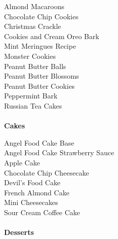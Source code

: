 \documentclass[11pt, twoside, openany]{book}
\begin{document}
Almond Macaroons\hrulefill\pageref{almond-macaroons}\\
Chocolate Chip Cookies\hrulefill\pageref{chocolate-chip-cookies}\\
Christmas Crackle\hrulefill\pageref{christmas-crackle}\\
Cookies and Cream Oreo Bark\hrulefill\pageref{cookies-and-cream-oreo-bark}\\
Mint Meringues Recipe\hrulefill\pageref{mint-meringues-recipe}\\
Monster Cookies\hrulefill\pageref{monster-cookies}\\
Peanut Butter Balls\hrulefill\pageref{peanut-butter-balls}\\
Peanut Butter Blossoms\hrulefill\pageref{peanut-butter-blossoms}\\
Peanut Butter Cookies\hrulefill\pageref{peanut-butter-cookies}\\
Peppermint Bark\hrulefill\pageref{peppermint-bark}\\
Russian Tea Cakes\hrulefill\pageref{russian-tea-cakes}\\
{~\vspace{2mm}\\ \Large \textbf{Cakes}}\hfill\textbf{\pageref{cakes}}

Angel Food Cake Base\hrulefill\pageref{angel-food-cake-base}\\
Angel Food Cake Strawberry Sauce\hrulefill\pageref{angel-food-cake-strawberry-sauce}\\
Apple Cake\hrulefill\pageref{apple-cake}\\
Chocolate Chip Cheesecake\hrulefill\pageref{chocolate-chip-cheesecake}\\
Devil's Food Cake\hrulefill\pageref{devil's-food-cake}\\
French Almond Cake\hrulefill\pageref{french-almond-cake}\\
Mini Cheesecakes\hrulefill\pageref{mini-cheesecakes}\\
Sour Cream Coffee Cake\hrulefill\pageref{sour-cream-coffee-cake}\\
{~\vspace{2mm}\\ \Large \textbf{Desserts}}\hfill\textbf{\pageref{desserts}}
\end{document}

